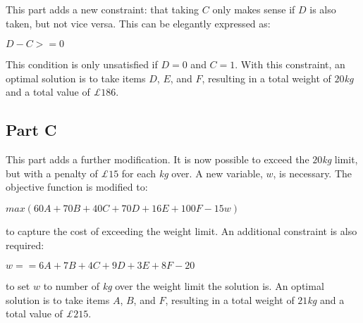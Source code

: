 \documentclass[11pt]{article} %
\begin{document}
This part adds a new constraint:  that taking $C$ only makes sense if $D$ is also taken, but not vice versa. This can be elegantly expressed as:

\begin{center}

$D - C >= 0$

\end{center}

This condition is only unsatisfied if $D = 0$ and $C = 1$. With this constraint, an optimal solution is to take items $D$, $E$, and $F$, resulting in a total weight of $20$\textit{kg} and a total value of \textit{£}$186$.

\subsection*{Part C}

This part adds a further modification. It is now possible to exceed the $20$\textit{kg} limit, but with a penalty of \textit{£}$15$ for each \textit{kg} over. A new variable, $w$, is necessary. The objective function is modified to:

\begin{center}

$max (60A + 70B + 40C + 70D + 16E + 100F - 15w)$

\end{center}

to capture the cost of exceeding the weight limit. An additional constraint is also required:

\begin{center}

$w == 6A + 7B + 4C + 9D + 3E + 8F - 20$

\end{center}

to set $w$ to number of \textit{kg} over the weight limit the solution is.
An optimal solution is to take items $A$, $B$, and $F$, resulting in a total weight of $21$\textit{kg} and a total value of \textit{£}$215$.
\end{document}
